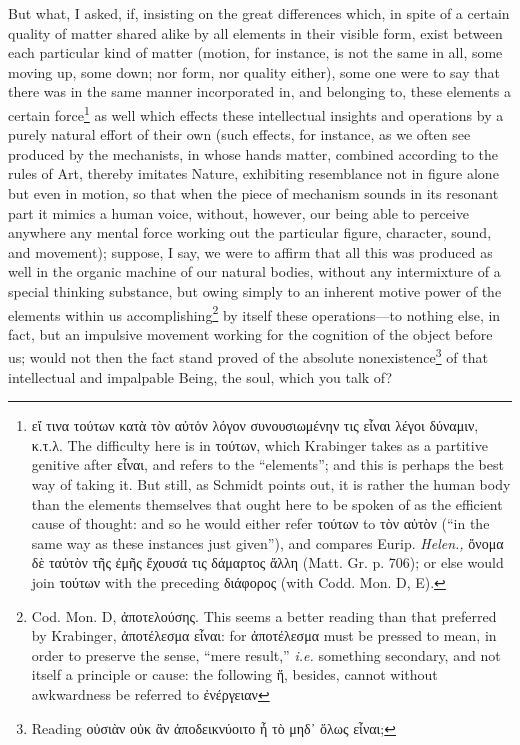 But what, I asked, if, insisting on the great differences which, in spite of a certain quality of matter shared alike by all elements in their visible form, exist between each particular kind of matter (motion, for instance, is not the same in all, some moving up, some down; nor form, nor quality either), some one were to say that there was in the same manner incorporated in, and belonging to, these elements a certain force\footnote{\textgreek{εἴ τινα τούτων κατὰ τὸν αὐτὁν λόγον συνουσιωμένην τις εἶναι λέγοι δύναμιν, κ.τ.λ}. The difficulty here is in \textgreek{τούτων}, which Krabinger takes as a partitive genitive after \textgreek{εἶναι}, and refers to the “elements”; and this is perhaps the best way of taking it. But still, as Schmidt points out, it is rather the human body than the elements themselves that ought here to be spoken of as the efficient cause of thought: and so he would either refer \textgreek{τούτων} to \textgreek{τὸν αὐτὸν} (“in the same way as these instances just given”), and compares Eurip. \emph{Helen.,} \textgreek{ὄνομα δὲ ταὐτὸν τῆς ἐμῆς ἔχουσά τις δάμαρτος ἄλλη} (Matt. Gr. p. 706); or else would join \textgreek{τούτων} with the preceding \textgreek{διάφορος} (with Codd. Mon. D, E).} as well which effects these intellectual insights and operations by a purely natural effort of their own (such effects, for instance, as we often see produced by the mechanists, in whose hands matter, combined according to the rules of Art, thereby imitates Nature, exhibiting resemblance not in figure alone but even in motion, so that when the piece of mechanism sounds in its resonant part it mimics a human voice, without, however, our being able to perceive anywhere any mental force working out the particular figure, character, sound, and movement); suppose, I say, we were to affirm that all this was produced as well in the organic machine of our natural bodies, without any intermixture of a special thinking substance, but owing simply to an inherent motive power of the elements within us accomplishing\footnote{Cod. Mon. D, \textgreek{ἀποτελούσης}. This seems a better reading than that preferred by Krabinger, \textgreek{ἀποτέλεσμα εἶναι}: for \textgreek{ἀποτέλεσμα} must be pressed to mean, in order to preserve the sense, “mere result,” \emph{i.e.} something secondary, and not itself a principle or cause: the following \textgreek{ἥ, be}sides, cannot without awkwardness be referred to \textgreek{ἐνέργειαν}} by itself these operations—to nothing else, in fact, but an impulsive movement working for the cognition of the object before us; would not then the fact stand proved of the absolute nonexistence\footnote{Reading \textgreek{οὐσιὰν οὐκ ἂν ἀποδεικνύοιτο ἦ τὸ μηδ᾽ ὅλως εἶναι};} of that intellectual and impalpable Being, the soul, which you talk of?

